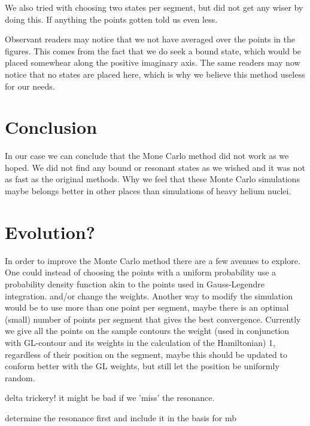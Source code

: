 \documentclass[../main/report.tex]{subfiles}
\begin{document}
We also tried with choosing two states per segment, but did not get any wiser by doing this.
If anything the points gotten told us even less.

Observant readers may notice that we not have averaged over the points in the figures.
This comes from the fact that we do seek a bound state, which would be placed somewhear along the positive imaginary axis.
The same readers may now notice that no states are placed here, which is why we believe this method useless for our needs.

\section{Conclusion}
In our case we can conclude that the Mone Carlo method did not work as we hoped.
We did not find any bound or resonant states as we wished and it was not as fast as the original methods.
Why we feel that these Monte Carlo simulations maybe belongs better in other places than simulations of heavy helium nuclei.

\section{Evolution?}
In order to improve the Monte Carlo method there are a few avenues to explore.
One could instead of choosing the points with a uniform probability use a probability density function akin to the points used in Gauss-Legendre integration. 
and/or change the weights.
Another way to modify the simulation would be to use more than one point per segment, maybe there is an optimal (small) number of points per segment that gives the best convergence. 
Currently we give all the points on the sample contours the weight (used in conjunction with GL-contour and its weights in the calculation of the Hamiltonian) 1, regardless of their position on the segment, maybe this should be updated to conform better with the GL weights, but still let the position be uniformly random.

delta trickery! it might be bad if we 'miss' the resonance.

determine the resonance first and include it in the basis for mb
\end{document}
